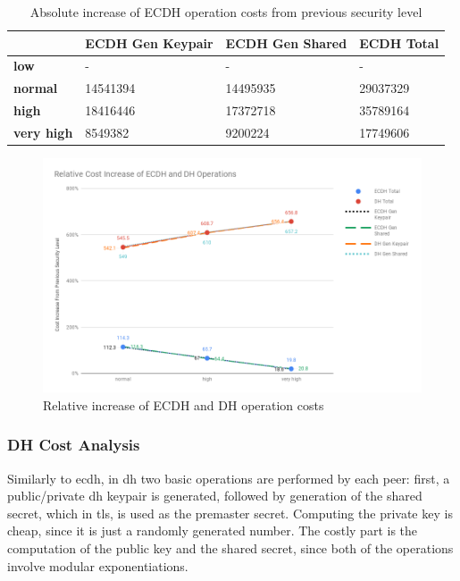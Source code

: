 \documentclass{llncs}
\begin{document}
\begin{table}[]
\begin{tabular}{|l|l|l|l|}
\hline
                   & \textbf{ECDH Gen Keypair} & \textbf{ECDH Gen Shared} & \textbf{ECDH Total} \\ \hline
\textbf{low}       & -                         & -                        & -                   \\ \hline
\textbf{normal}    & 14541394                  & 14495935                 & 29037329            \\ \hline
\textbf{high}      & 18416446                  & 17372718                 & 35789164            \\ \hline
\textbf{very high} & 8549382                   & 9200224                  & 17749606            \\ \hline
\end{tabular}
\centering \caption{\label{table:ecdh-absolute-cost-increase} Absolute increase of ECDH operation costs from previous security level}
\end{table}

  \begin{figure}
    \centering
    \includegraphics[width=1.0\textwidth]{img/ecdh_dh_relative_cost_increase.png}
    \centering \caption{\label{fig:ecdh-dh-relative-cost-increase} Relative increase of ECDH and DH operation costs}
  \end{figure}

\subsubsection{DH Cost Analysis}

Similarly to \gls{ecdh}, in \gls{dh} two basic operations are performed by each peer: first, a public/private \gls{dh} keypair is generated, followed
by generation of the shared secret, which in \gls{tls}, is used as the premaster secret. Computing the private key is cheap, since it is just a randomly
generated number. The costly part is the computation of the public key and the shared secret, since both of the operations involve modular exponentiations.
\end{document}
